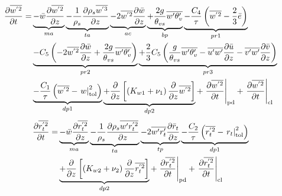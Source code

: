 \documentclass[11pt,fleqn]{article}
\newcommand{\ptlder}[2]{\frac{\partial #1}{\partial #2}}
\newcommand{\inverse}[1]{\frac{1}{#1}}
\begin{document}
%
\begin{equation}
\label{eq_wp2}
\begin{split}
\ptlder{\overline{w^{'2}}}{t} 
=& \underbrace{ - \bar{w}\ptlder{\overline{w^{'2}}}{z} }_{ma}
   \underbrace{ - \inverse{\rho_{s}}\ptlder{\rho_{s}\overline{w^{'3}}}{z} }_{ta}
   \underbrace{ - 2\overline{w^{'2}}\ptlder{\bar{w}}{z} }_{ac}
   \underbrace{ + \frac{2g}{\theta_{vs}} \overline{w'\theta'_v} }_{bp}
   \underbrace{ - \frac{C_4}{\tau} \left( \overline{w^{'2}} -\frac{2}{3}\bar{e} \right) }_{pr1} \\
 & \underbrace{ - C_5 
     \left(
       - 2\overline{w^{'2}}\ptlder{\bar{w}}{z}
       + \frac{2g}{\theta_{vs}} \overline{w'\theta'_v}
     \right) }_{pr2}
   \underbrace{ + \frac{2}{3} C_5
     \left(
       \frac{g}{\theta_{vs}} \overline{w'\theta'_v} 
       - \overline{u'w'}\ptlder{\bar{u}}{z} 
       - \overline{v'w'}\ptlder{\bar{v}}{z} 
     \right) }_{pr3} \\
 & \underbrace{ - \dfrac{C_1}{\tau} \left(   \overline{w^{'2}} 
                              - \left. w \right|_{\rm{tol}}^{2} \right) }_{dp1}
   \underbrace{ + \ptlder{}{z} \left[ \left( K_{w1} + \nu_1 \right)
                         \ptlder{}{z} \overline{w^{'2}} 
                  \right] }_{dp2}
   + \left. \ptlder{\overline{w^{'2}}}{t} \right|_{\rm{pd}}
   + \left. \ptlder{\overline{w^{'2}}}{t} \right|_{\rm{cl}}
\end{split}
\end{equation}
%
\begin{equation}
\label{eq_rtp2}
\begin{split}
\ptlder{\overline{r_t^{'2}}}{t}
=& \underbrace{ - \bar{w}\ptlder{\overline{r^{'2}_t}}{z} }_{ma}
   \underbrace{ - \inverse{\rho_{s}}\ptlder{\rho_{s}\overline{w'r_t^{'2}}}{z} }_{ta}
   \underbrace{ - 2\overline{w'r'_t}\ptlder{\bar{r}_t}{z} }_{tp}
   \underbrace{ - \dfrac{C_2}{\tau} \left(   \overline{r_t^{'2}} 
                              - \left. r_t \right|_{\rm{tol}}^{2} \right) }_{dp1} \\
 & \underbrace{ + \ptlder{}{z} \left[ \left( K_{w2} + \nu_2 \right)
                         \ptlder{}{z} \overline{r_t^{'2}} 
                  \right] }_{dp2}
   + \left. \ptlder{\overline{r_t^{'2}}}{t} \right|_{\rm{pd}}
   + \left. \ptlder{\overline{r_t^{'2}}}{t} \right|_{\rm{cl}}
\end{split}
\end{equation}
%
\end{document}
